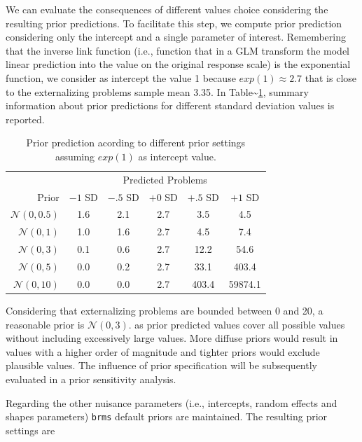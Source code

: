 \documentclass[
]{book}
\begin{document}
We can evaluate the consequences of different values choice considering the resulting prior predictions. To facilitate this step, we compute prior prediction considering only the intercept and a single parameter of interest. Remembering that the inverse link function (i.e., function that in a GLM transform the model linear prediction into the value on the original response scale) is the exponential function, we consider as intercept the value 1 because \(exp(1) \approx 2.7\) that is close to the externalizing problems sample mean 3.35. In Table\textasciitilde\ref{tab:table-prior-predict}, summary information about prior predictions for different standard deviation values is reported.

\begin{table}[!h]

\caption{\label{tab:table-prior-predict}Prior prediction acording to different prior settings assuming $exp(1)$ as intercept value.}
\centering
\begin{tabular}[t]{rccccc}
\toprule
\multicolumn{1}{c}{ } & \multicolumn{5}{c}{Predicted Problems} \\
\cmidrule(l{3pt}r{3pt}){2-6}
Prior & $-1$ SD & $-.5$ SD & $+0$ SD & $+ .5$ SD & $+ 1$ SD\\
\midrule
$\mathcal{N}(0, 0.5)$ & 1.6 & 2.1 & 2.7 & 3.5 & 4.5\\
$\mathcal{N}(0, 1)$ & 1.0 & 1.6 & 2.7 & 4.5 & 7.4\\
$\mathcal{N}(0, 3)$ & 0.1 & 0.6 & 2.7 & 12.2 & 54.6\\
$\mathcal{N}(0, 5)$ & 0.0 & 0.2 & 2.7 & 33.1 & 403.4\\
$\mathcal{N}(0, 10)$ & 0.0 & 0.0 & 2.7 & 403.4 & 59874.1\\
\bottomrule
\end{tabular}
\end{table}

Considering that externalizing problems are bounded between 0 and 20, a reasonable prior is \(\mathcal{N}(0,3)\). as prior predicted values cover all possible values without including excessively large values. More diffuse priors would result in values with a higher order of magnitude and tighter priors would exclude plausible values. The influence of prior specification will be subsequently evaluated in a prior sensitivity analysis.

Regarding the other nuisance parameters (i.e., intercepts, random effects and shapes parameters) \texttt{brms} default priors are maintained. The resulting prior settings are
\end{document}
